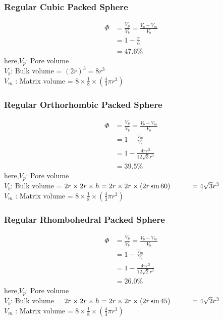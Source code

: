 \documentclass{article}
\begin{document}
\subsubsection*{Regular Cubic Packed Sphere} 
\begin{multicols}{2}
    \begin{align*}
        \Phi &= \frac{V_p}{V_b} = \frac{V_b-V_m}{V_b} \\ 
        &= 1- \frac{\pi}{6} \\
        &= 47.6\%  
    \end{align*}
    here,$V_p$: Pore volume \\
    $V_b$: Bulk volume = $(2r)^3 = 8r^3$\\
    $V_m$ : Matrix volume = $8\times \frac{1}{8} \times \left(\frac{4}{3} \pi r^3 \right) $
\end{multicols}

\subsubsection*{Regular Orthorhombic Packed Sphere} 
\begin{multicols}{2}
    \begin{align*}
        \Phi &= \frac{V_p}{V_b} = \frac{V_b-V_m}{V_b} \\ 
        &= 1- \frac{V_m}{V_b} \\
        &= 1- \frac{4\pi r^3}{12 \sqrt{3} r^3} \\
        &= 39.5\%  
    \end{align*}
    here,$V_p$: Pore volume \\
    $V_b$: Bulk volume = $2r \times 2r \times h = 2r \times 2r \times (2r \sin 60)\\  
    \hspace{1cm} = 4 \sqrt{3}r^3$\\
    $V_m$ : Matrix volume = $8\times \frac{1}{8} \times \left(\frac{4}{3} \pi r^3 \right) $
\end{multicols}

\subsubsection*{Regular Rhombohedral Packed Sphere} 
\begin{multicols}{2}
    \begin{align*}
        \Phi &= \frac{V_p}{V_b} = \frac{V_b-V_m}{V_b} \\ 
        &= 1- \frac{V_m}{V_b} \\
        &= 1- \frac{4\pi r^3}{12 \sqrt{2} r^3} \\
        &= 26.0\%  
    \end{align*}
    here,$V_p$: Pore volume \\
    $V_b$: Bulk volume = $2r \times 2r \times h = 2r \times 2r \times (2r \sin 45)\\  
    \hspace{1cm} = 4 \sqrt{2}r^3$\\
    $V_m$ : Matrix volume = $8\times \frac{1}{8} \times \left(\frac{4}{3} \pi r^3 \right) $
\end{multicols}
\end{document}
